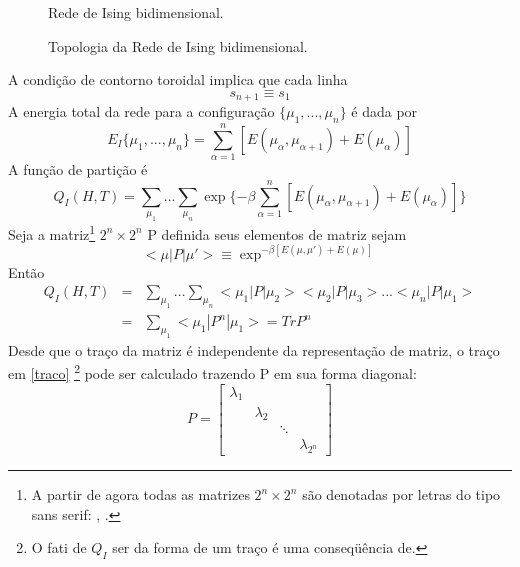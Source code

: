 \begin{figure}[h]
\begin{center}
\renewcommand{\figurename}{Fig.}
\caption{Rede de Ising bidimensional.}
\label{figC15_001}
\end{center}
\end{figure}
\begin{figure}[h]
\begin{center}
\renewcommand{\figurename}{Fig.}
\caption{Topologia da Rede de Ising bidimensional.}
\label{figC15_002}
\end{center}
\end{figure}
A condi\c{c}\~ao de contorno toroidal implica que cada linha
\begin{equation}
s_{n+1}\equiv s_{1}
\end{equation}
A energia total da rede para a configura\c{c}\~ao $\{\mu_{1},...,\mu_{n}\}$ \'e dada por
\begin{equation}
E_{I}\{\mu_{1},...,\mu_{n}\}=\sum_{\alpha=1}^{n}\left[E(\mu_{\alpha},\mu_{\alpha+1})+E(\mu_{\alpha}) \right]
\end{equation}
A fun\c{c}\~ao de parti\c{c}\~ao \'e
\begin{equation}
Q_{I}(H,T)=\sum_{\mu_{1}}...\sum_{\mu_{n}}
\exp \{ -\beta \sum_{\alpha=1}^{n}\left[E(\mu_{\alpha},\mu_{\alpha+1})+E(\mu_{\alpha}) \right] \}
\end{equation}
Seja a matriz\footnote{A partir de agora todas as matrizes $2^{n}\times 2^{n}$ s\~ao denotadas por letras do tipo sans serif: , . } $2^{n}\times 2^{n}$ P definida seus elementos de matriz sejam
\begin{equation}
<\mu| P |\mu'>\equiv
\exp^{-\beta \left[E(\mu,\mu')+E(\mu) \right]}
\end{equation}
Ent\~ao
\begin{eqnarray}
Q_{I}(H,T)&=&\sum_{\mu_{1}}...\sum_{\mu_{n}}
<\mu_{1}| P |\mu_{2}><\mu_{2}| P |\mu_{3}>...<\mu_{n}| P |\mu_{1}>
\nonumber
\\
&=&\sum_{\mu_{1}}<\mu_{1}| P^{n} |\mu_{1}>=Tr P^{n}
\label{traco}
\end{eqnarray}
Desde que o tra\c{c}o da matriz \'e independente da representa\c{c}\~ao de matriz, o tra\c{c}o em \ref{traco} \footnote{O fati de $Q_{I}$ ser da forma de um tra\c{c}o \'e uma conseq\"u\^encia de.} pode ser calculado trazendo P em sua forma diagonal:
\begin{equation}
P=\left[
\begin{array}{clcr}
\lambda_{1} &             &        & \\
            & \lambda_{2} &        & \\
            &             & \ddots & \\
            &             &        & \lambda_{2^{n}}
\end{array}
\right]
\end{equation}
